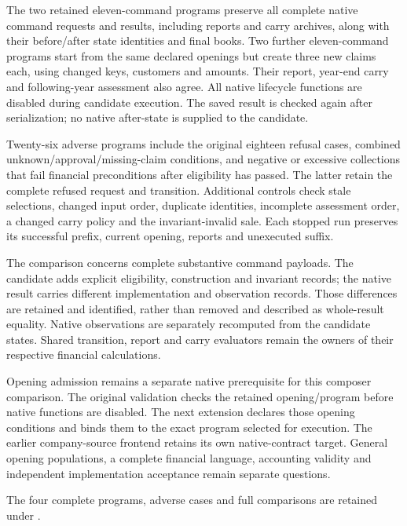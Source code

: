 The two retained eleven-command programs preserve all complete native command
requests and results, including reports and carry archives, along with their
before/after state identities and final books. Two further eleven-command
programs start from the same declared openings but create three new claims each,
using changed keys, customers and amounts. Their report, year-end carry and
following-year assessment also agree. All native lifecycle functions are
disabled during candidate execution. The saved result is checked again after
serialization; no native after-state is supplied to the candidate.

Twenty-six adverse programs include the original eighteen refusal cases,
combined unknown/approval/missing-claim conditions, and negative or excessive
collections that fail financial preconditions after eligibility has passed.
The latter retain the complete refused request and transition. Additional
controls check stale selections, changed input order, duplicate identities,
incomplete assessment order, a changed carry policy and the invariant-invalid
sale. Each stopped run preserves its successful prefix, current opening,
reports and unexecuted suffix.

The comparison concerns complete substantive command payloads. The candidate
adds explicit eligibility, construction and invariant records; the native
result carries different implementation and observation records. Those
differences are retained and identified, rather than removed and described as
whole-result equality. Native observations are separately recomputed from the
candidate states. Shared transition, report and carry evaluators remain the
owners of their respective financial calculations.

Opening admission remains a separate native prerequisite for this composer
comparison. The original validation checks the retained opening/program before
native functions are disabled. The next extension declares those opening
conditions and binds them to the exact program selected for execution. The
earlier company-source frontend retains its own native-contract target.
General opening populations, a complete financial language, accounting validity
and independent implementation acceptance remain separate questions.

\begingroup\raggedright
The four complete programs, adverse cases and full comparisons are retained
under .
\par
\endgroup
